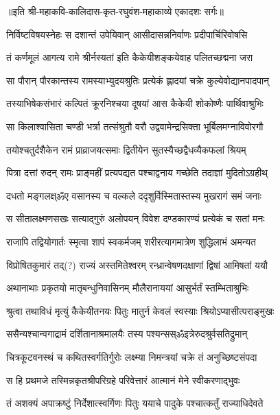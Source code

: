 ॥इति श्री-महाकवि-कालिदास-कृत-रघुवंश-महाकाव्ये एकादशः सर्गः॥


\twolineshloka
{निर्विष्टविषयस्नेहः स दशान्तं उपेयिवान्}
{आसीदासन्ननिर्वाणः प्रदीपार्चिरिवोषसि}%

\twolineshloka
{तं कर्णमूलं आगत्य रामे श्रीर्नस्यतां इति}
{कैकेयीशङ्कयेवाह पलितच्छद्मना जरा}%

\twolineshloka
{सा पौरान् पौरकान्तस्य रामस्याभ्युदयश्रुतिः}
{प्रत्येकं ह्लादयां चक्रे कुल्येवोद्यानपादपान्}%

\twolineshloka
{तस्याभिषेकसंभारं कल्पितं क्रूरनिश्चया}
{दूषयां आस कैकेयी शोकोष्णैः पार्थिवाश्रुभिः}%

\twolineshloka
{सा किलाश्वासिता चण्डी भर्त्रा तत्संश्रुतौ वरौ}
{उद्ववामेन्द्रसिक्ता भूर्बिलमग्नाविवोरगौ}%

\twolineshloka
{तयोश्चतुर्दशैकेन रामं प्राव्राजयत्समाः}
{द्वितीयेन सुतस्यैच्छद्वैधव्यैकफलां श्रियम्}%

\twolineshloka
{पित्रा दत्तां रुदन् रामः प्राङ्महीं प्रत्यपद्यत}
{पश्चाद्वनाय गच्छेति तदाज्ञां मुदितोऽग्रहीथ्}%

\twolineshloka
{दधतो मङ्गलक्ष्ॐए वसानस्य च वल्कले}
{ददृशुर्विस्मितास्तस्य मुखरागं समं जनाः}%

\twolineshloka
{स सीतालक्ष्मणसखः सत्याद्गुरुं अलोपयन्}
{विवेश दण्डकारण्यं प्रत्येकं च सतां मनः}%

\twolineshloka
{राजापि तद्वियोगार्तः स्मृत्वा शापं स्वकर्मजम्}
{शरीरत्यागमात्रेण शुद्धिलाभं अमन्यत}%

\twolineshloka
{विप्रोषितकुमारं तद्(?) राज्यं अस्तमितेश्वरम्}
{रन्ध्रान्वेषणदक्षाणां द्विषां आमिषतां ययौ}%

\twolineshloka
{अथानाथाः प्रकृतयो मातृबन्धुनिवासिनम्}
{मौलैरानाययां आसुर्भर्तं स्तम्भिताश्रुभिः}%

\twolineshloka
{श्रुत्वा तथाविधं मृत्युं कैकेयीतनयः पितुः}
{मातुर्न केवलं स्वस्याः श्रियोऽप्यासीत्पराङ्मुखः}%

\twolineshloka
{ससैन्यश्चान्वगाद्रामं दर्शितानाश्रमालयैः}
{तस्य पश्यन्सस्ॐइत्रेरुदश्रुर्वसतिद्रुमान्}%

\twolineshloka
{चित्रकूटवनस्थं च कथितस्वर्गतिर्गुरोः}
{लक्ष्म्या निमन्त्रयां चक्रे तं अनुच्छिष्टसंपदा}%

\twolineshloka
{स हि प्रथमजे तस्मिन्नकृतश्रीपरिग्रहे}
{परिवेत्तारं आत्मानं मेने स्वीकरणाद्भुवः}%

\twolineshloka
{तं अशक्यं अपाक्रष्टुं निर्देशात्स्वर्गिणः पितुः}
{ययाचे पादुके पश्चात्कर्तुं राज्याधिदेवते}%

